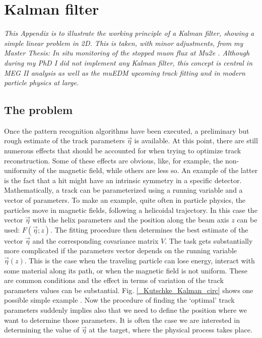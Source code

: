 \chapter{Kalman filter}
\begin{refsection}
{\itshape
This Appendix is to illustrate the working principle of a Kalman filter, showing a simple linear problem in 2D. This is taken, with minor adjustments, from my Master Thesis: In situ monitoring of the stopped muon flux at Mu2e \cite{mythesis}. Although during my PhD I did not implement any Kalman filter, this concept is central in MEG II analysis as well as the muEDM upcoming track fitting and in modern particle physics at large.}
\label{ch:Kalman}

\section{The problem}
    Once the pattern recognition algorithms have been executed, a preliminary but rough estimate of the track parameters $\vec{\eta}$ is available. 
    At this point, there are still numerous effects that should be accounted for when trying to optimize track reconstruction. 
    Some of these effects are obvious, like, for example, the non-uniformity of the magnetic field, while others are less so. 
    An example of the latter is the fact that a hit might have an intrinsic symmetry in a specific detector. \\

    \noindent
    Mathematically, a track can be parameterized using a running variable and a vector of parameters. 
    To make an example, quite often in particle physics, the particles move in magnetic fields, following a helicoidal trajectory. 
    In this case the vector $\vec{\eta}$ with the helix parameters and the position along the beam axis $z$ can be used: $F(\vec{\eta};z)$. 
    The fitting procedure then determines the best estimate of the vector $\vec{\eta}$ and the corresponding covariance matrix $V$. 
    The task gets substantially more complicated if the parameters vector depends on the running variable $\vec{\eta}(z)$. 
    This is the case when the traveling particle can lose energy, interact with some material along its path, or when the magnetic field is not uniform. 
    These are common conditions and the effect in terms of variation of the track parameters values can be substantial.
    Fig. \ref{_Kutschke_Kalman_circ} shows one possible simple example \cite{Kutschke}.
    Now the procedure of finding the `optimal' track parameters suddenly implies also that we need to define the position where we want to determine those parameters.
    It is often the case we are interested in determining the value of $\vec{\eta}$ at the target, where the physical process takes place. 


\end{refsection}
